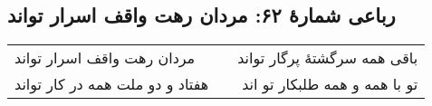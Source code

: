 \begin{center}
\section*{رباعی شمارهٔ ۶۲: مردان رهت واقف اسرار تواند}
\label{sec:062}
\begin{longtable}{l p{0.5cm} r}
مردان رهت واقف اسرار تواند
&&
باقی همه سرگشتهٔ پرگار تواند
\\
هفتاد و دو ملت همه در کار تواند
&&
تو با همه و همه طلبکار تو اند
\\
\end{longtable}
\end{center}
